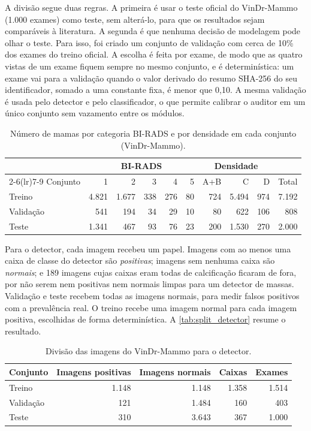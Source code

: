 A divisão segue duas regras. A primeira é usar o teste oficial do VinDr-Mammo (1.000 exames) como teste, sem alterá-lo, para que os resultados sejam comparáveis à literatura. A segunda é que nenhuma decisão de modelagem pode olhar o teste. Para isso, foi criado um conjunto de validação com cerca de 10\% dos exames do treino oficial. A escolha é feita por exame, de modo que as quatro vistas de um exame fiquem sempre no mesmo conjunto, e é determinística: um exame vai para a validação quando o valor derivado do resumo SHA-256 do seu identificador, somado a uma constante fixa, é menor que 0,10. A mesma validação é usada pelo detector e pelo classificador, o que permite calibrar o auditor em um único conjunto sem vazamento entre os módulos.

\begin{table}[htb]
  \centering
  \caption{Número de mamas por categoria BI-RADS e por densidade em cada conjunto (VinDr-Mammo).}
  \label{tab:dist_mamas}
  \small
  \begin{tabular}{@{}lrrrrrrrrr@{}}
    \toprule
    & \multicolumn{5}{c}{BI-RADS} & \multicolumn{3}{c}{Densidade} & \\
    \cmidrule(lr){2-6}\cmidrule(lr){7-9}
    Conjunto & 1 & 2 & 3 & 4 & 5 & A+B & C & D & Total \\
    \midrule
    Treino    & 4.821 & 1.677 & 338 & 276 & 80 & 724 & 5.494 & 974 & 7.192 \\
    Validação &   541 &   194 &  34 &  29 & 10 &  80 &   622 & 106 &   808 \\
    Teste     & 1.341 &   467 &  93 &  76 & 23 & 200 & 1.530 & 270 & 2.000 \\
    \bottomrule
  \end{tabular}
\end{table}

Para o detector, cada imagem recebeu um papel. Imagens com ao menos uma caixa de classe do detector são \textit{positivas}; imagens sem nenhuma caixa são \textit{normais}; e 189 imagens cujas caixas eram todas de calcificação ficaram de fora, por não serem nem positivas nem normais limpas para um detector de massas. Validação e teste recebem todas as imagens normais, para medir falsos positivos com a prevalência real. O treino recebe uma imagem normal para cada imagem positiva, escolhidas de forma determinística. A \autoref{tab:split_detector} resume o resultado.

\begin{table}[htb]
  \centering
  \caption{Divisão das imagens do VinDr-Mammo para o detector.}
  \label{tab:split_detector}
  \begin{tabular}{@{}lrrrr@{}}
    \toprule
    Conjunto & Imagens positivas & Imagens normais & Caixas & Exames \\
    \midrule
    Treino    & 1.148 & 1.148 & 1.358 & 1.514 \\
    Validação &   121 & 1.484 &   160 &   403 \\
    Teste     &   310 & 3.643 &   367 & 1.000 \\
    \bottomrule
  \end{tabular}
\end{table}

